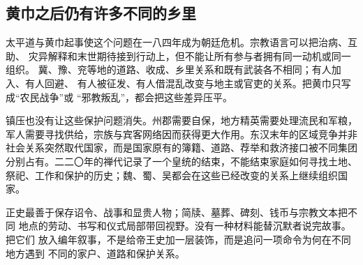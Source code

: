 \subsection{黄巾之后仍有许多不同的乡里}

太平道与黄巾起事使这个问题在一八四年成为朝廷危机。宗教语言可以把治病、互助、
灾异解释和末世期待接到行动上，但不能让所有参与者拥有同一动机或同一组织。
冀、豫、兖等地的道路、收成、乡里关系和既有武装各不相同；有人加入、有人回避、
有人被征发、有人借混乱改变与地主或官吏的关系。把黄巾只写成“农民战争”或
“邪教叛乱”，都会把这些差异压平。

镇压也没有让这些保护问题消失。州郡需要自保，地方精英需要处理流民和军粮，
军人需要寻找供给，宗族与宾客网络因而获得更大作用。东汉末年的区域竞争并非
社会关系突然取代国家，而是国家原有的簿籍、道路、荐举和救济接口被不同集团
分别占有。二二〇年的禅代记录了一个皇统的结束，不能结束家庭如何寻找土地、
祭祀、工作和保护的历史；魏、蜀、吴都会在这些已经改变的关系上继续组织国家。

\begin{textwindow}
正史最善于保存诏令、战事和显贵人物；简牍、墓葬、碑刻、钱币与宗教文本把不同
地点的劳动、书写和仪式局部带回视野。没有一种材料能替沉默者说完故事。把它们
放入编年叙事，不是给帝王史加一层装饰，而是追问一项命令为何在不同地方遇到
不同的家户、道路和保护关系。
\end{textwindow}
